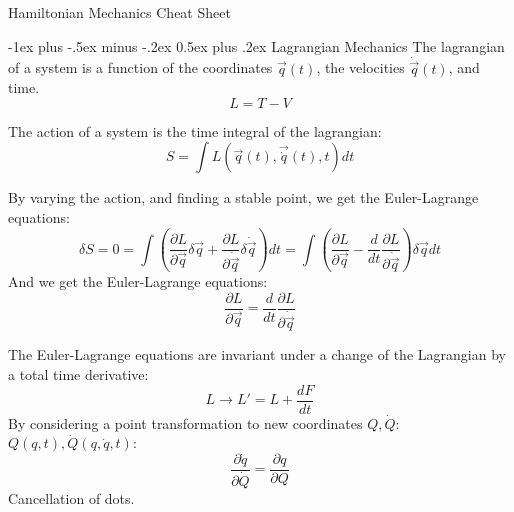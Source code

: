 \documentclass[10pt,landscape]{article}
\makeatletter
\renewcommand{\section}{\@startsection{section}{1}{0mm}%
                                {-1ex plus -.5ex minus -.2ex}%
                                {0.5ex plus .2ex}%
                                {\normalfont\large\bfseries}}
\makeatother
\begin{document}
\raggedright
\footnotesize
\begin{multicols}{3}


\setlength{\premulticols}{1pt}
\setlength{\postmulticols}{1pt}
\setlength{\multicolsep}{1pt}
\setlength{\columnsep}{2pt}

\begin{center}
     \Large{Hamiltonian Mechanics Cheat Sheet} \\
\end{center}

\section{Lagrangian Mechanics}
The lagrangian of a system is a function of the coordinates $\vec{q}(t)$, the velocities $\dot{\vec q}(t)$, and time.
\begin{equation}
	L = T-V 
\end{equation}

The action of a system is the time integral of the lagrangian:
\begin{equation}
	S = \int L(\vec{ q}(t), \vec {\dot q}(t), t) dt
\end{equation}

By varying the action, and finding a stable point, we get the Euler-Lagrange equations:
\begin{equation}
	\delta S = 0 = \int \left(\frac{\partial L}{\partial \vec{q}}\delta \vec{q} + \frac{\partial L}{\partial \dot{\vec q}} \delta \dot{\vec q}\right)dt = \int \left(\frac{\partial L}{\partial \vec{q}}-\frac{d}{dt} \frac{\partial L}{\partial \dot{\vec q}} \right)\delta \vec{q} dt
\end{equation}
And we get the Euler-Lagrange equations:
\begin{equation}
	\frac{\partial L}{\partial \vec{q}}=\frac{d}{dt}\frac{\partial L}{\partial \dot{\vec q}}
\end{equation}

The Euler-Lagrange equations are invariant under a change of the Lagrangian by a total time derivative:
\begin{equation}
	L \rightarrow L' = L + \frac{dF}{dt}
\end{equation}
By considering a point transformation to new coordinates $Q, \dot Q$: $Q(q, t), \dot Q(q, \dot q, t) $:
\begin{equation}
	\frac{\partial \dot q}{\partial \dot Q} = \frac{\partial q}{\partial Q}
\end{equation}
Cancellation of dots.

\end{multicols}
\end{document}
